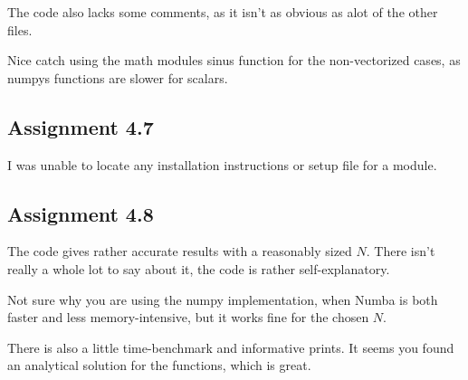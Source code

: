 \documentclass[12p,a4paper]{article}
\begin{document}
The code also lacks some comments, as it isn't as obvious as alot of the other files.

Nice catch using the math modules sinus function for the non-vectorized cases, as numpys functions are slower for scalars.

\subsection*{Assignment 4.7}
I was unable to locate any installation instructions or setup file for a module.


\subsection*{Assignment 4.8}
The code gives rather accurate results with a reasonably sized $N$. There isn't really a whole lot to say about it, the code is rather self-explanatory.

Not sure why you are using the numpy implementation, when Numba is both faster and less memory-intensive, but it works fine for the chosen $N$.

There is also a little time-benchmark and informative prints. It seems you found an analytical solution for the functions, which is great.
\end{document}
